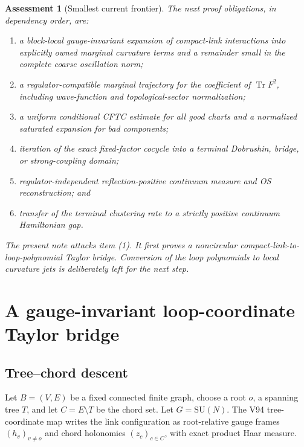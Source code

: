 \documentclass[11pt,oneside]{book}
\newtheorem{assessment}[theorem]{Assessment}
\theoremstyle{definition}
\theoremstyle{remark}
\newcommand{\Tr}{\operatorname{Tr}}
\begin{document}
\begin{assessment}[Smallest current frontier]
\label{ass:e8v1-frontier}
The next proof obligations, in dependency order, are:
\begin{enumerate}[label=\textup{(\arabic*)},leftmargin=3.5em]
\item a block-local gauge-invariant expansion of compact-link
      interactions into explicitly owned marginal curvature terms and
      a remainder small in the complete coarse oscillation norm;
\item a regulator-compatible marginal trajectory for the coefficient
      of \(\Tr F^2\), including wave-function and topological-sector
      normalization;
\item a uniform conditional CFTC estimate for all good charts and a
      normalized saturated expansion for bad components;
\item iteration of the exact fixed-factor cocycle into a terminal
      Dobrushin, bridge, or strong-coupling domain;
\item regulator-independent reflection-positive continuum measure and
      OS reconstruction; and
\item transfer of the terminal clustering rate to a strictly positive
      continuum Hamiltonian gap.
\end{enumerate}
The present note attacks item (1).  It first proves a noncircular
compact-link-to-loop-polynomial Taylor bridge.  Conversion of the loop
polynomials to local curvature jets is deliberately left for the next
step.
\end{assessment}

\chapter{A gauge-invariant loop-coordinate Taylor bridge}
\label{ch:e8v1-loop}

\section{Tree--chord descent}
\label{sec:e8v1-descent}

Let \(B=(V,E)\) be a fixed connected finite graph, choose a root
\(o\), a spanning tree \(T\), and let \(C=E\setminus T\) be the chord
set.  Let \(G=\mathrm{SU}(N)\).  The V94 tree-coordinate map writes
the link configuration as root-relative gauge frames
\((h_v)_{v\neq o}\) and chord holonomies
\((z_c)_{c\in C}\), with exact product Haar measure.
\end{document}
